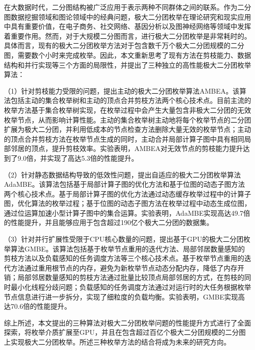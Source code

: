\cleardoublepage
{}

在大数据时代，二分图结构被广泛应用于表示两种不同群体之间的联系。作为二分图数据挖掘领域和图论领域中的经典问题，极大二分团枚举在理论研究和现实应用中具有重要价值，在电子商务、社交网络、基因分析以及图神经网络等领域中发挥着重要作用。然而，对于大规模二分图而言，进行极大二分团枚举是非常耗时的。具体而言，现有的极大二分团枚举方法对于包含数千万个极大二分团规模的二分图，需要数个小时来完成枚举。因此，本文重新思考了现有方法在剪枝能力、数据结构和并行实现等三个方面的局限性，并提出了三种独立的高性能极大二分团枚举算法：

（1）针对剪枝能力受限的问题，提出主动的极大二分团枚举算法AMBEA。该算法包括主动的集合枚举树和主动的顶点合并剪枝方法两个核心技术点。目前主流的枚举方法基于集合枚举树实现，在枚举过程中会产生大量包含非极大二分团的无效枚举节点，从而影响计算性能。主动的集合枚举树主动地将每个枚举节点的二分团扩展为极大二分团，并利用低成本的节点检查方法删除大量无效的枚举节点；主动的顶点合并剪枝方法在枚举节点生成的同时，主动合并局部计算子图中具有相同局部邻居的顶点，提升剪枝效率。实验表明，AMBEA对无效节点的剪枝能力提升达到了9.0倍，并实现了高达5.3倍的性能提升。

（2）针对静态数据结构导致的低效性问题，提出自适应的极大二分团枚举算法AdaMBE。该算法包括基于局部计算子图的优化方法和基于位图的动态子图方法两个核心技术点。基于局部计算子图的优化方法通过动态缓存枚举过程中的计算子图，优化算法的枚举过程；基于位图的动态子图方法在枚举过程中动态生成位图，通过位运算加速小型计算子图中的集合运算。实验表明，AdaMBE实现高达49.7倍的性能提升，并且能够应用于包含超过190亿个极大二分团的数据集。

（3）针对并行扩展性受限于CPU核心数量的问题，提出基于GPU的极大二分团枚举算法GMBE。该算法包括基于枚举节点重用的迭代方法、局部邻居数量感知的剪枝方法以及负载感知的任务调度方法等三个核心技术点。基于枚举节点重用的迭代方法通过重用根节点的内存，避免为新枚举节点动态分配内存，降低了内存开销；局部邻居数量感知的剪枝方法通过批量比较顶点局部邻居的方式，在剪枝的同时最小化线程分歧问题；负载感知的任务调度方法通过对运行时的大任务根据枚举节点信息进行进一步拆分，实现了细粒度的负载均衡。实验表明，GMBE实现高达70.6倍的性能提升。

综上所述，本文提出的三种算法对极大二分团枚举问题的性能提升方式进行了全面探索，将枚举介质扩展至GPU，并且在包含超过百亿个极大二分团规模的二分图上实现极大二分团枚举。所述三种枚举方法的结合将成为未来的研究方向。



